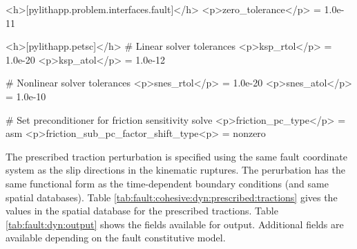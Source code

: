 

\begin{cfg}
<h>[pylithapp.problem.interfaces.fault]</h>
<p>zero_tolerance</p> = 1.0e-11

<h>[pylithapp.petsc]</h>
# Linear solver tolerances
<p>ksp_rtol</p> = 1.0e-20
<p>ksp_atol</p> = 1.0e-12

# Nonlinear solver tolerances
<p>snes_rtol</p> = 1.0e-20
<p>snes_atol</p> = 1.0e-10

# Set preconditioner for friction sensitivity solve
<p>friction_pc_type</p> = asm
<p>friction_sub_pc_factor_shift_type<p> = nonzero
\end{cfg}

The prescribed traction perturbation is specified using the same fault
coordinate system as the slip directions in the kinematic ruptures.
The perurbation has the same functional form as the time-dependent
boundary conditions (and same spatial databases). Table
\vref{tab:fault:cohesive:dyn:prescribed:tractions} gives the values in
the spatial database for the prescribed tractions.  Table
\vref{tab:fault:dyn:output} shows the fields available for output.
Additional fields are available depending on the fault constitutive
model.

